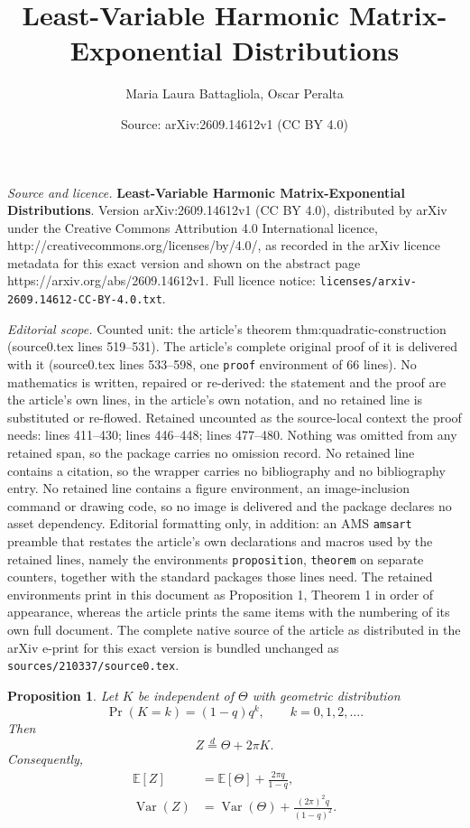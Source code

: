 \documentclass[10pt,a4paper]{amsart}
\title{\textbf{Least-Variable Harmonic Matrix-Exponential Distributions}}
\author{Maria Laura Battagliola, Oscar Peralta}
\date{Source: arXiv:2609.14612v1 (CC BY 4.0)}
\newtheorem{proposition}{Proposition}
\newcommand{\E}{\mathbb E}
\newcommand{\Var}{\operatorname{Var}}
\begin{document}
\maketitle

\noindent\emph{Source and licence.} \textbf{Least-Variable Harmonic Matrix-Exponential Distributions}. Version arXiv:2609.14612v1 (CC BY 4.0), distributed by arXiv under the Creative Commons Attribution 4.0 International licence, http://creativecommons.org/licenses/by/4.0/, as recorded in the arXiv licence metadata for this exact version and shown on the abstract page https://arxiv.org/abs/2609.14612v1. Full licence notice: \texttt{licenses/arxiv-2609.14612-CC-BY-4.0.txt}.\par\smallskip

\noindent\textit{Editorial scope.} Counted unit: the article's theorem thm:quadratic-construction (source0.tex lines 519--531). The article's complete original proof of it is delivered with it (source0.tex lines 533--598, one \texttt{proof} environment of 66 lines). No mathematics is written, repaired or re-derived: the statement and the proof are the article's own lines, in the article's own notation, and no retained line is substituted or re-flowed.  Retained uncounted as the source-local context the proof needs: lines 411--430; lines 446--448; lines 477--480.  Nothing was omitted from any retained span, so the package carries no omission record.  No retained line contains a citation, so the wrapper carries no bibliography and no bibliography entry.  No retained line contains a figure environment, an image-inclusion command or drawing code, so no image is delivered and the package declares no asset dependency.  Editorial formatting only, in addition: an AMS \texttt{amsart} preamble that restates the article's own declarations and macros used by the retained lines, namely the environments \texttt{proposition}, \texttt{theorem} on separate counters, together with the standard packages those lines need.  The retained environments print in this document as Proposition 1, Theorem 1 in order of appearance, whereas the article prints the same items with the numbering of its own full document.  The complete native source of the article as distributed in the arXiv e-print for this exact version is bundled unchanged as \texttt{sources/210337/source0.tex}.
\begin{proposition}\label{prop:period-decomposition}
Let $K$ be independent of $\Theta$ with geometric distribution
\[
  \Pr(K=k)=(1-q)q^k,
  \qquad k=0,1,2,\ldots.
\]
Then
\begin{equation}\label{eq:period-sum}
  Z\stackrel d=\Theta+2\pi K.
\end{equation}
Consequently,
\begin{align}
  \E[Z]
  &=\E[\Theta]+\frac{2\pi q}{1-q},
  \label{eq:period-mean}\\
  \Var(Z)
  &=\Var(\Theta)+\frac{(2\pi)^2q}{(1-q)^2}.
  \label{eq:period-variance}
\end{align}
\end{proposition}
\end{document}
